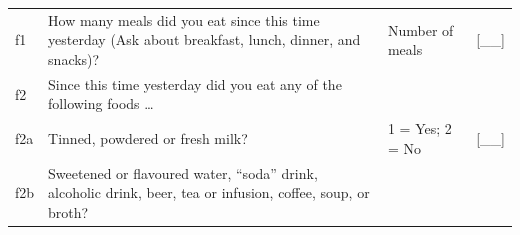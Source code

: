 \documentclass[12pt,a4paper]{book}
\theoremstyle{definition}
\theoremstyle{definition}
\theoremstyle{definition}
\theoremstyle{remark}
\begin{document}
\begin{longtable}[]{@{}llll@{}}
\toprule
\begin{minipage}[t]{0.09\columnwidth}\raggedright
f1\strut
\end{minipage} & \begin{minipage}[t]{0.41\columnwidth}\raggedright
How many meals did you eat since this time yesterday (Ask about
breakfast, lunch, dinner, and snacks)?\strut
\end{minipage} & \begin{minipage}[t]{0.25\columnwidth}\raggedright
Number of meals\strut
\end{minipage} & \begin{minipage}[t]{0.13\columnwidth}\raggedright
{[}\_\_{]}\strut
\end{minipage}\tabularnewline
\begin{minipage}[t]{0.09\columnwidth}\raggedright
f2\strut
\end{minipage} & \begin{minipage}[t]{0.41\columnwidth}\raggedright
Since this time yesterday did you eat any of the following foods
\ldots{}\strut
\end{minipage} & \begin{minipage}[t]{0.25\columnwidth}\raggedright
\strut
\end{minipage} & \begin{minipage}[t]{0.13\columnwidth}\raggedright
\strut
\end{minipage}\tabularnewline
\begin{minipage}[t]{0.09\columnwidth}\raggedright
f2a\strut
\end{minipage} & \begin{minipage}[t]{0.41\columnwidth}\raggedright
Tinned, powdered or fresh milk?\strut
\end{minipage} & \begin{minipage}[t]{0.25\columnwidth}\raggedright
1 = Yes; 2 = No\strut
\end{minipage} & \begin{minipage}[t]{0.13\columnwidth}\raggedright
{[}\_\_{]}\strut
\end{minipage}\tabularnewline
\begin{minipage}[t]{0.09\columnwidth}\raggedright
f2b\strut
\end{minipage} & \begin{minipage}[t]{0.41\columnwidth}\raggedright
Sweetened or flavoured water, ``soda'' drink, alcoholic drink, beer, tea
or infusion, coffee, soup, or broth?\strut
\end{minipage} & \begin{minipage}[t]{0.25\columnwidth}\raggedright

\end{minipage}
\end{longtable}
\end{document}
